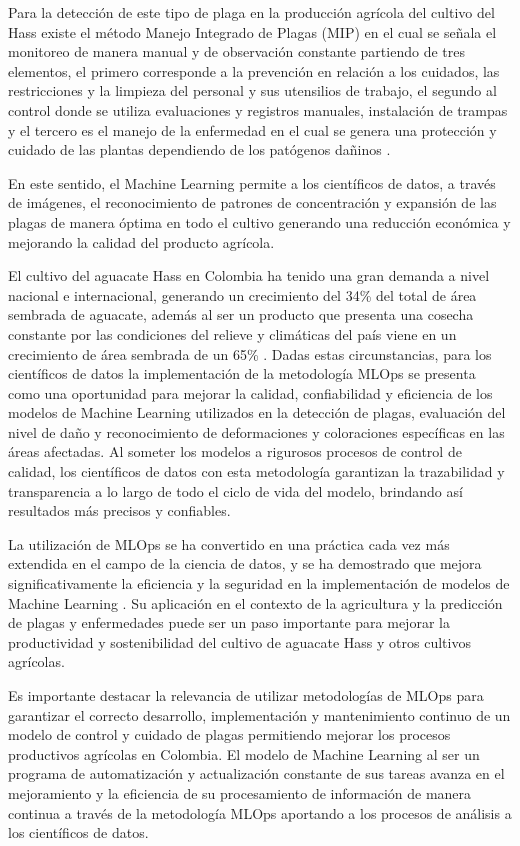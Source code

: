Para la detección de este tipo de plaga en la producción agrícola del cultivo del Hass existe el método Manejo Integrado de Plagas (MIP) en el cual se señala el monitoreo de manera manual y de observación constante partiendo de tres elementos, el primero corresponde a la prevención en relación a los cuidados, las restricciones y la limpieza del personal y sus utensilios de trabajo, el segundo al control donde se utiliza evaluaciones y registros manuales, instalación de trampas y el tercero es el manejo de la enfermedad en el cual se genera una protección y cuidado de las plantas dependiendo de los patógenos dañinos \citep{ica2012manejo}.

En este sentido, el Machine Learning permite a los científicos de datos, a través de imágenes, el reconocimiento de patrones de concentración y expansión de las plagas de manera óptima en todo el cultivo generando una reducción económica y mejorando la calidad del producto agrícola.

El cultivo del aguacate Hass en Colombia ha tenido una gran demanda a nivel nacional e internacional, generando un crecimiento del 34\% del total de área sembrada de aguacate, además al ser un producto que presenta una cosecha constante por las condiciones del relieve y climáticas del país viene en un crecimiento de área sembrada de un 65\% \citep{proyectocolombiamide2021}. Dadas estas circunstancias, para los científicos de datos la implementación de la metodología MLOps se presenta como una oportunidad para mejorar la calidad, confiabilidad y eficiencia de los modelos de Machine Learning utilizados en la detección de plagas, evaluación del nivel de daño y reconocimiento de deformaciones y coloraciones específicas en las áreas afectadas. Al someter los modelos a rigurosos procesos de control de calidad, los científicos de datos con esta metodología garantizan la trazabilidad y transparencia a lo largo de todo el ciclo de vida del modelo, brindando así resultados más precisos y confiables.

\newpage
La utilización de MLOps se ha convertido en una práctica cada vez más extendida en el campo de la ciencia de datos, y se ha demostrado que mejora significativamente la eficiencia y la seguridad en la implementación de modelos de Machine Learning \citep{geron2019hands}. Su aplicación en el contexto de la agricultura y la predicción de plagas y enfermedades puede ser un paso importante para mejorar la productividad y sostenibilidad del cultivo de aguacate Hass y otros cultivos agrícolas.

Es importante destacar la relevancia de utilizar metodologías de MLOps para garantizar el correcto desarrollo, implementación y mantenimiento continuo de un modelo de control y cuidado de plagas permitiendo mejorar los procesos productivos agrícolas en Colombia. El modelo de Machine Learning al ser un programa de automatización y actualización constante de sus tareas avanza en el mejoramiento y la eficiencia de su procesamiento de información de manera continua a través de la metodología MLOps aportando a los procesos de análisis a los científicos de datos.

